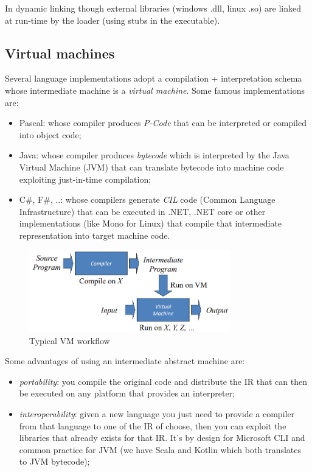 In dynamic linking though external libraries (windows .dll, linux .so) are linked at run-time by the loader (using stubs in the executable).

\subsection{Virtual machines}
Several language implementations adopt a compilation + interpretation schema whose intermediate machine is a \emph{virtual machine}.
Some famous implementations are:
\begin{itemize}
    \item Pascal: whose compiler produces \emph{P-Code} that can be interpreted or compiled into object code;
    \item Java: whose compiler produces \emph{bytecode} which is interpreted by the Java Virtual Machine (JVM) that can translate bytecode into machine code exploiting just-in-time compilation;
    \item C\#, F\#, ..: whose compilers generate \emph{CIL} code (Common Language Infrastructure) that can be executed in .NET, .NET core or other implementations (like Mono for Linux) that compile that intermediate representation into target machine code.
\end{itemize}

\begin{figure}[H]
    \centering
    \includegraphics[width=330px]{images/1_Introduction/VM.png}
    \caption{Typical VM workflow}
\end{figure}

Some advantages of using an intermediate abstract machine are:
\begin{itemize}
    \item \emph{portability}: you compile the original code and distribute the IR that can then be executed on any platform that provides an interpreter;
    
    \item \emph{interoperability}: given a new language you just need to provide a compiler from that language to one of the IR of choose, then you can exploit the libraries that already exists for that IR.
    It's by design for Microsoft CLI and common practice for JVM (we have Scala and Kotlin which both translates to JVM bytecode);
\end{itemize}

